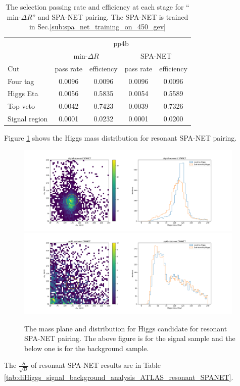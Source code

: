 \documentclass[12pt]{article}
\begin{document}
		\begin{table}[htpb]
			\centering
			\caption{The selection passing rate and efficiency at each stage for ``$\text{min-}\Delta R$'' and SPA-NET pairing. The SPA-NET is trained in Sec.\ref{sub:spa_net_training_on_450_gev}}
			\label{tab:signal_selection_efficiency_background_resonant_SPANET}
			\begin{tabular}{l|cc|cc}
							  & \multicolumn{4}{c}{pp4b}                                                         \\
							  & \multicolumn{2}{c|}{$\text{min-}\Delta R$}& \multicolumn{2}{c}{SPA-NET} \\
				Cut           & pass rate               & efficiency                & pass rate    & efficiency   \\ \hline
				Four tag      & 0.0096                  & 0.0096                    & 0.0096       & 0.0096       \\
				Higgs Eta     & 0.0056                  & 0.5835                    & 0.0054       & 0.5589       \\
				Top veto      & 0.0042                  & 0.7423                    & 0.0039       & 0.7326      \\
				Signal region & 0.0001                  & 0.0232                    & 0.0001       & 0.0200       \\
			\end{tabular}
		\end{table}

		Figure \ref{fig:Higgs_mass_new_resonant_SPANET} shows the Higgs mass distribution for resonant SPA-NET pairing.
		\begin{figure}[htpb]
			\centering
			\includegraphics[width=0.97\textwidth]{Higgs_mass_new_res-SPANET_s.png}
			\includegraphics[width=0.97\textwidth]{Higgs_mass_new_res-SPANET_4b.png}
			\caption{The mass plane and distribution for Higgs candidate for resonant SPA-NET pairing. The above figure is for the signal sample and the below one is for the background sample.}
			\label{fig:Higgs_mass_new_resonant_SPANET}
		\end{figure}
		The $\frac{S}{\sqrt{B}}$ of resonant SPA-NET results are in Table \ref{tab:diHiggs_signal_background_analysis_ATLAS_resonant_SPANET}.
\end{document}
